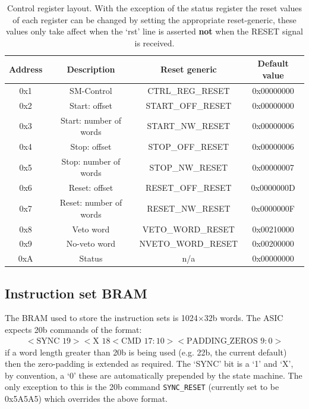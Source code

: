 \begin{table}
  \begin{center}
    \begin{tabular}{c|c | c |c}
      Address & Description             & Reset generic      & Default value  \\
      \hline                    
      0x1     & SM-Control              & CTRL\_REG\_RESET   & 0x00000000     \\ 
      0x2     & Start: offset           & START\_OFF\_RESET  & 0x00000000     \\  
      0x3     & Start: number of words  & START\_NW\_RESET   & 0x00000006     \\ 
      0x4     & Stop: offset            & STOP\_OFF\_RESET   & 0x00000006     \\ 
      0x5     & Stop: number of words   & STOP\_NW\_RESET    & 0x00000007     \\ 
      0x6     & Reset: offset           & RESET\_OFF\_RESET  & 0x0000000D     \\ 
      0x7     & Reset: number of words  & RESET\_NW\_RESET   & 0x0000000F     \\ 
      0x8     & Veto word               & VETO\_WORD\_RESET  & 0x00210000     \\ 
      0x9     & No-veto word            & NVETO\_WORD\_RESET & 0x00200000     \\ 
      0xA     & Status                  & n/a                & 0x00000000     \\ 
    \end{tabular}
  \end{center}
  \caption{Control register layout. With the exception of the status register the reset values of each register can be changed by setting the appropriate reset-generic, these values only take affect when the `rst' line is asserted \textbf{not} when the RESET signal is received.}
  \label{tab:ctrl_reg_default}
\end{table}

\subsection{Instruction set BRAM} %
\label{sub:tx_bram}
The BRAM used to store the instruction sets is 1024\(\times\)32b words. The ASIC expects 20b commands of the format:
\begin{align}\label{fmt:asic_format}
  <\text{SYNC }19><\text{X }18<\text{CMD } 17:10><\text{PADDING\_ZEROS } 9:0>
\end{align}
if a word length greater than 20b is being used (e.g. 22b, the current default) then the zero-padding is extended as required. The `SYNC' bit is a `1' and `X', by convention, a `0' these are automatically prepended by the state machine. The only exception to this is the 20b command \texttt{SYNC\_RESET} (currently set to be 0x5A5A5) which overrides the above format.

